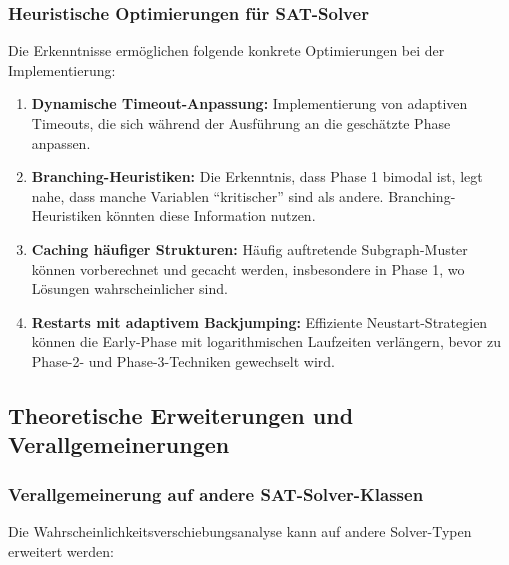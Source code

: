 ﻿\documentclass[a4paper,12pt]{article}
\theoremstyle{definition}
\begin{document}
\subsubsection{Heuristische Optimierungen für SAT-Solver}

Die Erkenntnisse ermöglichen folgende konkrete Optimierungen bei der Implementierung:

\begin{enumerate}
	\item \textbf{Dynamische Timeout-Anpassung:} Implementierung von adaptiven Timeouts, die sich während der Ausführung an die geschätzte Phase anpassen.
	
	\item \textbf{Branching-Heuristiken:} Die Erkenntnis, dass Phase 1 bimodal ist, legt nahe, dass manche Variablen ``kritischer'' sind als andere. Branching-Heuristiken könnten diese Information nutzen.
	
	\item \textbf{Caching häufiger Strukturen:} Häufig auftretende Subgraph-Muster können vorberechnet und gecacht werden, insbesondere in Phase 1, wo Lösungen wahrscheinlicher sind.
	
	\item \textbf{Restarts mit adaptivem Backjumping:} Effiziente Neustart-Strategien können die Early-Phase mit logarithmischen Laufzeiten verlängern, bevor zu Phase-2- und Phase-3-Techniken gewechselt wird.
\end{enumerate}

\subsection{Theoretische Erweiterungen und Verallgemeinerungen}

\subsubsection{Verallgemeinerung auf andere SAT-Solver-Klassen}

Die Wahrscheinlichkeitsverschiebungsanalyse kann auf andere Solver-Typen erweitert werden:
\end{document}
